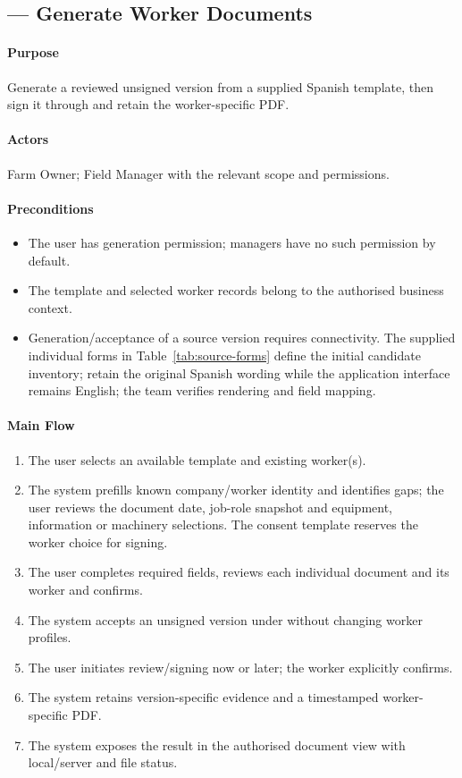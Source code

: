 \subsection{ --- Generate Worker Documents}\label{uc:20}

\paragraph{Purpose}
Generate a reviewed unsigned version from a supplied Spanish template, then sign it through  and retain the worker-specific PDF.

\paragraph{Actors}
Farm Owner; Field Manager with the relevant scope and permissions.

\paragraph{Preconditions}
\begin{itemize}
\item The user has generation permission; managers have no such permission by default.
\item The template and selected worker records belong to the authorised business context.
\item Generation/acceptance of a source version requires connectivity. The supplied individual forms in Table~\ref{tab:source-forms} define the initial candidate inventory; retain the original Spanish wording while the application interface remains English; the team verifies rendering and field mapping.
\end{itemize}

\paragraph{Main Flow}
\begin{enumerate}
\item The user selects an available template and existing worker(s).
\item The system prefills known company/worker identity and identifies gaps; the user reviews the document date, job-role snapshot and equipment, information or machinery selections. The consent template reserves the worker choice for signing.
\item The user completes required fields, reviews each individual document and its worker and confirms.
\item The system accepts an unsigned version under  without changing worker profiles.
\item The user initiates  review/signing now or later; the worker explicitly confirms.
\item The system retains version-specific evidence and a timestamped worker-specific PDF.
\item The system exposes the result in the authorised document view with local/server and file status.
\end{enumerate}

